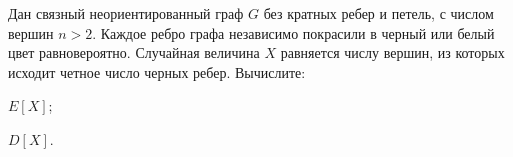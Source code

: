 Дан связный неориентированный граф $G$ без кратных ребер и петель, с числом вершин $n > 2$. Каждое ребро графа независимо
покрасили в черный или белый цвет равновероятно. Случайная величина $X$ равняется числу вершин, из которых исходит четное
число черных ребер. Вычислите:
\begin{enumcyr}
    \item $E[X]$;
    \item $D[X]$.
\end{enumcyr}


